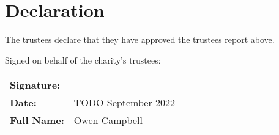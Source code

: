 \documentclass[11pt, final]{article}
\begin{document}
\section{Declaration}
The trustees declare that they have approved the trustees report above.


Signed on behalf of the charity's trustees:

\begin{tabular}{l l}
	\textbf{Signature:}\vspace{3cm}                       \\
	\textbf{Date:}      & TODO September 2022\vspace{1cm} \\
	\textbf{Full Name:} & Owen Campbell                   \\
\end{tabular}
\end{document}
